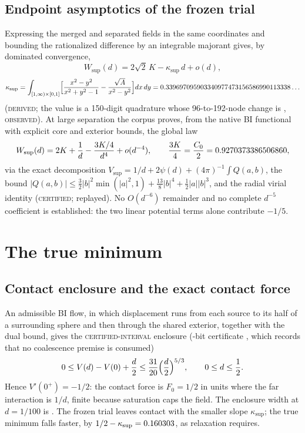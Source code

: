 \documentclass[aps,prd,onecolumn,amsmath,amssymb,longbibliography,floatfix,nofootinbib]{revtex4-2}
\newcommand{\Wsup}{W_{\mathrm{sup}}}
\newcommand{\Vsup}{V_{\mathrm{sup}}}
\newcommand{\st}[1]{\textsc{#1}}
\begin{document}
\subsection{Endpoint asymptotics of the frozen trial}
\label{sec:asym}
Expressing the merged and separated fields in the same coordinates and bounding the rationalized difference by an integrable majorant gives, by dominated convergence,
\begin{equation}
\Wsup(d)=2\sqrt2\,K-\kappa_{\mathrm{sup}}\,d+o(d),
\end{equation}
\begin{equation}
\kappa_{\mathrm{sup}}=\int_{[1,\infty)\times[0,1]}\Bigl[\frac{x^2-y^2}{x^2+y^2-1}-\frac{\sqrt{A}}{x^2-y^2}\Bigr]dx\,dy=0.339697095903340977473156586990113338\ldots
\end{equation}
(\st{derived}; the value is a 150-digit quadrature whose 96-to-192-node change is \KappaChangeVal, \st{observed}). At large separation the corpus proves, from the native BI functional with explicit core and exterior bounds, the global law
\begin{equation}
\Wsup(d)=2K+\frac1d-\frac{3K/4}{d^4}+o(d^{-4}),\qquad \frac{3K}{4}=\frac{C_0}{2}=\FrozenCfourVal ,
\end{equation}
via the exact decomposition $\Vsup=1/d+2\psi(d)+(4\pi)^{-1}\int Q(a,b)$, the bound $|Q(a,b)|\le\tfrac32|b|^2\min(|a|^2,1)+\tfrac{13}{8}|b|^4+\tfrac12|a||b|^3$, and the radial virial identity (\st{certified}; replayed). No $O(d^{-6})$ remainder and no complete $d^{-5}$ coefficient is established: the two linear potential terms alone contribute $-1/5$.

\section{The true minimum}
\label{sec:true}

\subsection{Contact enclosure and the exact contact force}
An admissible BI flow, in which displacement runs from each source to its half of a surrounding sphere and then through the shared exterior, together with the dual bound, gives the \st{certified-interval} enclosure (\ContactBitsVal-bit certificate , which records that no coalescence premise is consumed)
\begin{equation}
0\le V(d)-V(0)+\frac d2\le\frac{31}{20}\Bigl(\frac d2\Bigr)^{5/3},\qquad 0\le d\le\frac12 .
\end{equation}
Hence $V'(0^+)=-1/2$: the contact force is $F_0=1/2$ in units where the far interaction is $1/d$, finite because saturation caps the field. The enclosure width at $d=1/100$ is \ContactWidthHundredthVal. The frozen trial leaves contact with the smaller slope $\kappa_{\mathrm{sup}}$; the true minimum falls faster, by $1/2-\kappa_{\mathrm{sup}}=0.160303$, as relaxation requires.
\end{document}
